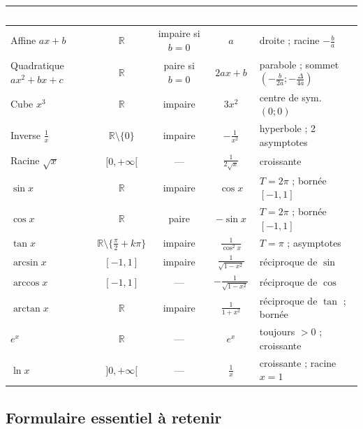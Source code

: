 \documentclass[11pt,a4paper]{article}
\newcommand{\R}{\mathbb{R}}
\newcommand{\Df}{D_f}
\begin{document}
\begin{center}
\footnotesize
\renewcommand{\arraystretch}{1.45}
\setlength{\tabcolsep}{5pt}
\begin{tabular}{|>{\raggedright\arraybackslash}p{2.7cm}|c|c|c|>{\raggedright\arraybackslash}p{4.6cm}|}
\hline
\rowcolor{primary}
\textcolor{white}{\textbf{Fonction}} & \textcolor{white}{\textbf{$\Df$}} &
\textcolor{white}{\textbf{Parité}} & \textcolor{white}{\textbf{Dérivée}} &
\textcolor{white}{\textbf{Particularité}} \\
\hline
Affine \;$ax+b$ & $\R$ & impaire si $b{=}0$ & $a$ & droite ; racine $-\tfrac{b}{a}$ \\
\hline
\rowcolor{primarylight}
Quadratique \;$ax^2{+}bx{+}c$ & $\R$ & paire si $b{=}0$ & $2ax{+}b$ & parabole ; sommet $\left(-\tfrac{b}{2a};-\tfrac{\Delta}{4a}\right)$ \\
\hline
Cube \;$x^3$ & $\R$ & impaire & $3x^2$ & centre de sym. $(0;0)$ \\
\hline
\rowcolor{primarylight}
Inverse \;$\tfrac1x$ & $\R\setminus\{0\}$ & impaire & $-\tfrac{1}{x^2}$ & hyperbole ; 2 asymptotes \\
\hline
Racine \;$\sqrt{x}$ & $[0,+\infty[$ & --- & $\tfrac{1}{2\sqrt x}$ & croissante \\
\hline
\rowcolor{primarylight}
$\sin x$ & $\R$ & impaire & $\cos x$ & $T{=}2\pi$ ; bornée $[-1,1]$ \\
\hline
$\cos x$ & $\R$ & paire & $-\sin x$ & $T{=}2\pi$ ; bornée $[-1,1]$ \\
\hline
\rowcolor{primarylight}
$\tan x$ & $\R\setminus\{\tfrac{\pi}{2}{+}k\pi\}$ & impaire & $\tfrac{1}{\cos^2 x}$ & $T{=}\pi$ ; asymptotes \\
\hline
$\arcsin x$ & $[-1,1]$ & impaire & $\tfrac{1}{\sqrt{1-x^2}}$ & réciproque de $\sin$ \\
\hline
\rowcolor{primarylight}
$\arccos x$ & $[-1,1]$ & --- & $-\tfrac{1}{\sqrt{1-x^2}}$ & réciproque de $\cos$ \\
\hline
$\arctan x$ & $\R$ & impaire & $\tfrac{1}{1+x^2}$ & réciproque de $\tan$ ; bornée \\
\hline
\rowcolor{primarylight}
$e^{x}$ & $\R$ & --- & $e^{x}$ & toujours $>0$ ; croissante \\
\hline
$\ln x$ & $]0,+\infty[$ & --- & $\tfrac1x$ & croissante ; racine $x{=}1$ \\
\hline
\end{tabular}
\end{center}

\subsection{Formulaire essentiel à retenir}
\end{document}

